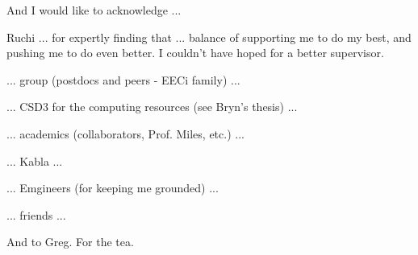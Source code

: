 
\begin{acknowledgements}      

And I would like to acknowledge ...

Ruchi ... for expertly finding that ... balance of supporting me to do my best, and pushing me to do even better. I couldn't have hoped for a better supervisor.

... group (postdocs and peers - EECi family) ...

... CSD3 for the computing resources (see Bryn's thesis) ...

... academics (collaborators, Prof. Miles, etc.) ...

... Kabla ...

... Emgineers (for keeping me grounded) ...

... friends ...

And to Greg. For the tea.


\end{acknowledgements}
